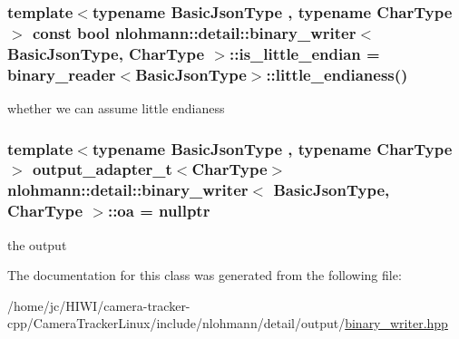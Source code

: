 \subsubsection[{\texorpdfstring{is\+\_\+little\+\_\+endian}{is_little_endian}}]{\setlength{\rightskip}{0pt plus 5cm}template$<$typename Basic\+Json\+Type , typename Char\+Type $>$ const bool {\bf nlohmann\+::detail\+::binary\+\_\+writer}$<$ Basic\+Json\+Type, Char\+Type $>$\+::is\+\_\+little\+\_\+endian = {\bf binary\+\_\+reader}$<$Basic\+Json\+Type$>$\+::little\+\_\+endianess()\hspace{0.3cm}{\ttfamily [private]}}\hypertarget{classnlohmann_1_1detail_1_1binary__writer_a048887c907afe39759b777e8c888414c}{}\label{classnlohmann_1_1detail_1_1binary__writer_a048887c907afe39759b777e8c888414c}


whether we can assume little endianess 

\subsubsection[{\texorpdfstring{oa}{oa}}]{\setlength{\rightskip}{0pt plus 5cm}template$<$typename Basic\+Json\+Type , typename Char\+Type $>$ {\bf output\+\_\+adapter\+\_\+t}$<$Char\+Type$>$ {\bf nlohmann\+::detail\+::binary\+\_\+writer}$<$ Basic\+Json\+Type, Char\+Type $>$\+::oa = nullptr\hspace{0.3cm}{\ttfamily [private]}}\hypertarget{classnlohmann_1_1detail_1_1binary__writer_a6f15b782a7900f50ef37d123008e601b}{}\label{classnlohmann_1_1detail_1_1binary__writer_a6f15b782a7900f50ef37d123008e601b}


the output 



The documentation for this class was generated from the following file\+:\begin{DoxyCompactItemize}
\item 
/home/jc/\+H\+I\+W\+I/camera-\/tracker-\/cpp/\+Camera\+Tracker\+Linux/include/nlohmann/detail/output/\hyperlink{binary__writer_8hpp}{binary\+\_\+writer.\+hpp}\end{DoxyCompactItemize}
